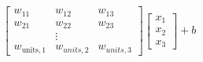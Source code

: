 \documentclass[preview]{standalone}
\begin{document}
\begin{align*}
\begin{bmatrix} w_{11} & w_{12} & w_{13} \\
                       w_{21} & w_{22} & w_{23} \\ & \vdots & \\
                       w_{\text{units}, 1} & w_{units, 2} & w_{units, 3}
                       \end{bmatrix} \begin{bmatrix} x_1 \\ x_2 \\ x_3\end{bmatrix} + b
\end{align*}
\end{document}
